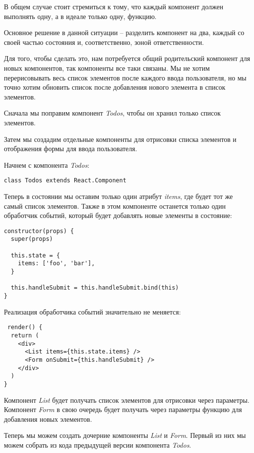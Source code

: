 В общем случае стоит стремиться к тому, что каждый компонент должен выполнять одну, а в идеале только одну, функцию.

Основное решение в данной ситуации -- разделить компонент на два, каждый со своей частью состояния и, соответственно, зоной ответственности.

Для того, чтобы сделать это, нам потребуется общий родительский компонент для новых компонентов, так компоненты все таки связаны. Мы не хотим перерисовывать весь список элементов после каждого ввода пользователя, но мы точно хотим обновить список после добавления нового элемента в список элементов.

Сначала мы поправим компонент \textit{Todos}, чтобы он хранил только список элементов. 

Затем мы создадим отдельные компоненты для отрисовки списка элементов и отображения формы для ввода пользователя.

Начнем с компонента \textit{Todos}:

\begin{lstlisting}
class Todos extends React.Component
\end{lstlisting}

Теперь в состоянии мы оставим только один атрибут \textit{items}, где будет тот же самый список элементов. Также в этом компоненте останется только один обработчик событий, который будет добавлять новые элементы в состояние:

\begin{lstlisting}
constructor(props) {
  super(props)
  
  this.state = {
    items: ['foo', 'bar'],
  }
  
  this.handleSubmit = this.handleSubmit.bind(this)
}
\end{lstlisting}

Реализация обработчика событий значительно не меняется:

\begin{lstlisting}
 render() {
  return (
    <div>
      <List items={this.state.items} />
      <Form onSubmit={this.handleSubmit} />
    </div>
  )
}
\end{lstlisting}

Компонент \textit{List} будет получать список элементов для отрисовки через параметры. Компонент \textit{Form} в свою очередь будет получать через параметры функцию для добавления новых элементов.

Теперь мы можем создать дочерние компоненты \textit{List} и \textit{Form}. Первый из них мы можем собрать из кода предыдущей версии компонента \textit{Todos}.


